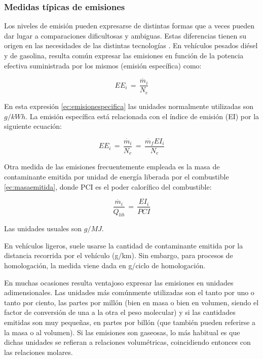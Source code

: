 \subsubsection{Medidas típicas de emisiones}
\par Los niveles de emisión pueden expresarse de distintas formas que a veces pueden dar lugar a comparaciones dificultosas y ambiguas. Estas diferencias tienen su origen en las necesidades de las distintas tecnologías \cite{turns:1996}. En vehículos pesados diésel y de gasolina, resulta común expresar las emisiones en función de la potencia efectiva suministrada por los mismos (emisión específica) como:

\begin{equation}
\label{ec:emisionespecifica}
EE_i\,=\, \dfrac{\dot{m_i}}{N_e}
\end{equation}

En esta expresión \ref{ec:emisionespecifica} las unidades normalmente utilizadas son $g/kWh$. La emisión específica está relacionada con el índice de emisión (EI) por la siguiente ecuación: 

\begin{equation}
\label{ec:EI}
EE_i\,=\, \dfrac{\dot{m_i}}{N_e}\,=\, \dfrac{\dot{m_f}EI_i}{N_e}
\end{equation}

\par Otra medida de las emisiones frecuentemente empleada es la masa de contaminante emitida por unidad de energía liberada por el combustible \ref{ec:masaemitida}, donde PCI es el poder calorífico del combustible:

\begin{equation}
\label{ec:masaemitida}
\dfrac{\dot{m_i}}{Q_{lib}}\,=\, \dfrac{EI_i}{PCI}
\end{equation}

\par Las unidades usuales son $g/MJ$. 

\par En vehículos ligeros, suele usarse la cantidad de contaminante emitida por la distancia recorrida por el vehículo (g/km). Sin embargo, para procesos de homologación, la medida viene dada en g/ciclo de homologación. 

\par En muchas ocasiones resulta ventajoso expresar las emisiones en unidades adimensionales. Las unidades más comúnmente utilizadas son el tanto por uno o tanto por ciento, las partes por millón (bien en masa o bien en volumen, siendo el factor de conversión de una a la otra el peso molecular) y si las cantidades emitidas son muy pequeñas, en partes por billón (que también pueden referirse a la masa o al volumen). Si las emisiones son gaseosas, lo más habitual es que dichas unidades se refieran a relaciones volumétricas, coincidiendo entonces con las relaciones molares.

